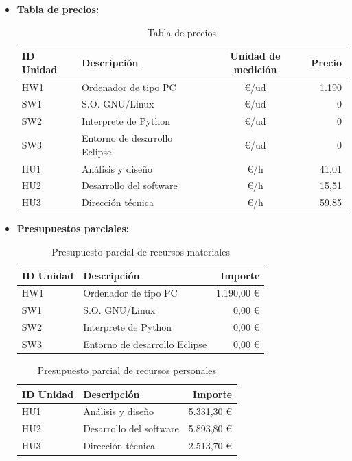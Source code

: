 \begin{itemize}

  \item \textbf{Tabla de precios:}
	\begin{table}[H]
	\begin{center}
	\begin{tabular}{|l|l|c|r|}
		\hline
		\textbf{ID Unidad} & \textbf{Descripción} & \textbf{Unidad de medición} & \textbf{Precio} \\
		\hline
		HW1 & Ordenador de tipo PC & \euro/ud & 1.190 \\
		\hline
		SW1 & S.O. GNU/Linux & \euro/ud & 0 \\
		\hline
		SW2 & Interprete de Python & \euro/ud & 0 \\
		\hline
		SW3 & Entorno de desarrollo Eclipse & \euro/ud & 0 \\
		\hline
		HU1 & Análisis y diseño & \euro/h & 41,01 \\
		\hline
		HU2 & Desarrollo del software & \euro/h & 15,51 \\
		\hline
		HU3 & Dirección técnica & \euro/h & 59,85 \\
		\hline
	\end{tabular}
	\caption{Tabla de precios}
	\end{center}
	\end{table}

  \item \textbf{Presupuestos parciales:}
	\begin{table}[H]
	 \begin{center}
	  \begin{tabular}{|l|l|r|}
		\hline
		\textbf{ID Unidad} & \textbf{Descripción} & \textbf{Importe} \\
		\hline
		HW1 & Ordenador de tipo PC & 1.190,00 \euro \\
		\hline
		SW1 & S.O. GNU/Linux & 0,00 \euro \\
		\hline
		SW2 & Interprete de Python & 0,00 \euro \\
		\hline
		SW3 & Entorno de desarrollo Eclipse & 0,00 \euro \\
		\hline
	  \end{tabular}
	  \caption{Presupuesto parcial de recursos materiales}
	 \end{center}
	\end{table}

	\begin{table}[H]
	 \begin{center}
	  \begin{tabular}{|l|l|r|}
		\hline
		\textbf{ID Unidad} & \textbf{Descripción} & \textbf{Importe} \\
		\hline
		HU1 & Análisis y diseño & 5.331,30 \euro \\
		\hline
		HU2 & Desarrollo del software & 5.893,80 \euro \\
		\hline
		HU3 & Dirección técnica & 2.513,70 \euro \\
		\hline
	  \end{tabular}
	  \caption{Presupuesto parcial de recursos personales}
	 \end{center}
	\end{table}	


\end{itemize}
